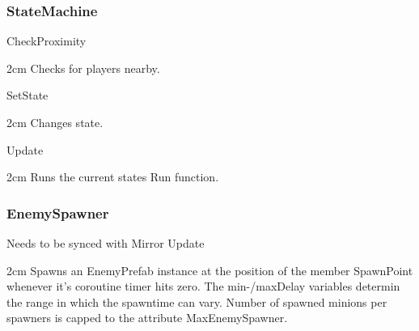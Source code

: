 \documentclass[11pt]{article}
\newenvironment{indentall}{\begin{adjustwidth}{2cm}{}}{\end{adjustwidth}}
\begin{document}
\subsubsection{StateMachine}
CheckProximity
\begin{indentall}
Checks for players nearby.
\end{indentall}
SetState
\begin{indentall}
Changes state.
\end{indentall}
Update
\begin{indentall}
Runs the current states Run function.
\end{indentall}

\newpage

\subsubsection{EnemySpawner}
Needs to be synced with Mirror
\newline
\newline Update
\begin{indentall}
Spawns an EnemyPrefab instance at the position of the member SpawnPoint whenever it's coroutine timer hits zero. The min-/maxDelay variables determin the range in which the spawntime can vary. Number of spawned minions per spawners is capped to the attribute MaxEnemySpawner. 
\end{indentall}
\end{document}

